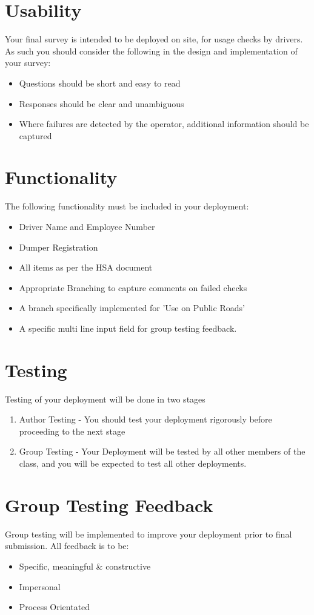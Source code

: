 \section*{Usability}

Your final survey is intended to be deployed on site, for usage checks by drivers.  As such you should consider the following in the design and implementation of your survey:
\begin{itemize}
	\item Questions should be short and easy to read
	\item Responses should be clear and unambiguous
	\item Where failures are detected by the operator, additional information should be captured
\end{itemize}

\newpage
\section*{Functionality}

The following functionality must be included in your deployment:
\begin{itemize}
	\item Driver Name and Employee Number
	\item Dumper Registration
	\item All items as per the HSA document
	\item Appropriate Branching to capture comments on failed checks
	\item A branch specifically implemented for 'Use on Public Roads'
	\item A specific multi line input field for group testing feedback.
\end{itemize}

\section*{Testing}
Testing of your deployment will be done in two stages
\begin{enumerate}
	\item Author Testing - You should test your deployment rigorously before proceeding to the next stage
	\item Group Testing - Your Deployment will be tested by all other members of the class, and you will be expected to test all other deployments.
\end{enumerate}


\newpage
\section*{Group Testing Feedback}
Group testing will be implemented to improve your deployment prior to final submission. All feedback is to be:
\begin{itemize}
	\item Specific, meaningful \& constructive
	\item Impersonal
	\item Process Orientated
\end{itemize}

